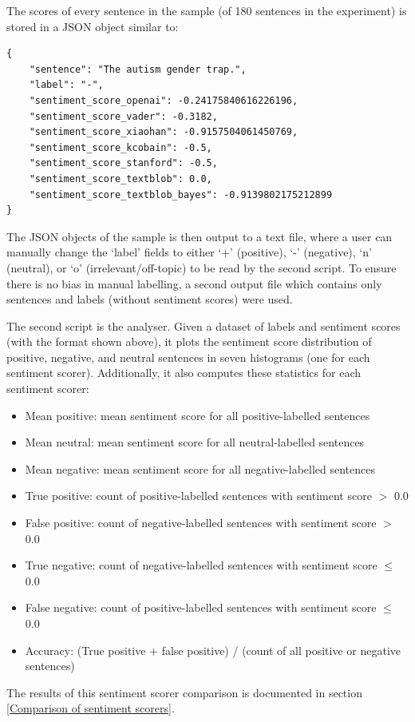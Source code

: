 \documentclass{report}
\begin{document}
The scores of every sentence in the sample (of 180 sentences in the experiment) is stored in a JSON object similar to:
\begin{lstlisting}
{
	"sentence": "The autism gender trap.",
	"label": "-",
	"sentiment_score_openai": -0.24175840616226196,
	"sentiment_score_vader": -0.3182,
	"sentiment_score_xiaohan": -0.9157504061450769,
	"sentiment_score_kcobain": -0.5,
	"sentiment_score_stanford": -0.5,
	"sentiment_score_textblob": 0.0,
	"sentiment_score_textblob_bayes": -0.9139802175212899
}
\end{lstlisting}
The JSON objects of the sample is then output to a text file, where a user can manually change the `label' fields to either `+' (positive), `-' (negative), `n' (neutral), or `o' (irrelevant/off-topic) to be read by the second script.
To ensure there is no bias in manual labelling, a second output file which contains only sentences and labels (without sentiment scores) were used.

The second script is the analyser.
Given a dataset of labels and sentiment scores (with the format shown above), it plots the sentiment score distribution of positive, negative, and neutral sentences in seven histograms (one for each sentiment scorer).
Additionally, it also computes these statistics for each sentiment scorer:
\begin{itemize}
	\item Mean positive: mean sentiment score for all positive-labelled sentences
	\item Mean neutral: mean sentiment score for all neutral-labelled sentences
	\item Mean negative: mean sentiment score for all negative-labelled sentences
	\item True positive: count of positive-labelled sentences with sentiment score $>$ 0.0
	\item False positive: count of negative-labelled sentences with sentiment score $>$ 0.0 
	\item True negative: count of negative-labelled sentences with sentiment score $\le$ 0.0
	\item False negative: count of positive-labelled sentences with sentiment score $\le$ 0.0
	\item Accuracy: (True positive + false positive) / (count of all positive or negative sentences)
\end{itemize}
The results of this sentiment scorer comparison is documented in section \ref{Comparison of sentiment scorers}.
\end{document}

